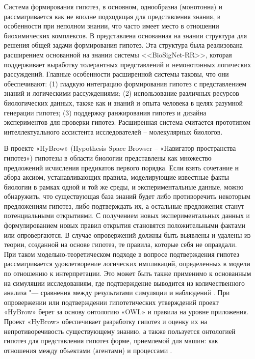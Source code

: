 Система формирования гипотез, в основном, однообразна (монотонна) и рассматривается как не вполне подходящая для 
представления знания, в особенности при неполном знании, что часто имеет место в отношении биохимических комплексов. 
В \cite{tran2005knowledge} представлена основанная на знании структура для решения общей задачи формирования гипотез. 
Эта структура была реализована расширением основанной на знании системы <<BioSigNet-RR>>, которая поддерживает 
выработку толерантных представлений и немонотонных логических рассуждений. Главные особенности расширенной системы 
таковы, что они обеспечивают: (1) гладкую интеграцию формирования гипотез с представлением знаний и логическими 
рассуждениями; (2) использование различных ресурсов биологических данных, также как и знаний и опыта человека в целях 
разумной генерации гипотез; (3) поддержку ранжирования гипотез и дизайна экспериментов для проверки гипотез. 
Расширенная система считается прототипом интеллектуального ассистента исследователей – молекулярных биологов.

В проекте «HyBrow» (Hypothesis Space Browser – «Навигатор пространства гипотез») \cite{racunas2004hybrow} гипотезы 
в области биологии представлены как множество предложений исчисления предикатов первого порядка. Если взять сочетание н
абора аксиом, устанавливающих правила, моделирующие известные факты биологии в рамках одной и той же среды, и 
экспериментальные данные, можно обнаружить, что существующая база знаний будет либо противоречить некоторым 
предложениям гипотез, либо подтверждать их, а остальные предложения станут потенциальными открытиями. С получением 
новых экспериментальных данных и формулированием новых правил открытия становятся положительными фактами или 
опровергаются. В случае опровержений должны быть выявлены и удалены из теории, созданной на основе гипотез, те 
правила, которые себя не оправдали. При таком модельно-теоретическом подходе в вопросе подтверждения гипотез 
рассматривается удовлетворение логических импликаций, определенных в модели по отношению к интерпретации. Это может 
быть также применимо к основанным на симуляции исследованиям, где подтверждение выводится из количественного 
анализа "--- сравнения между результатами симуляции и наблюдений \cite{porto2013}. При опровержении или подтверждении 
гипотетических утверждений проект «HyBrow» берет за основу онтологию «OWL» и правила на уровне приложения. 
Проект «HyBrow» обеспечивает разработку гипотез и оценку их на непротиворечивость существующему знанию, а также 
пользуется онтологией гипотез для представления гипотез форме, приемлемой для машин: как отношения между объектами 
(агентами) и процессами \cite{soldatova2011representation}.

